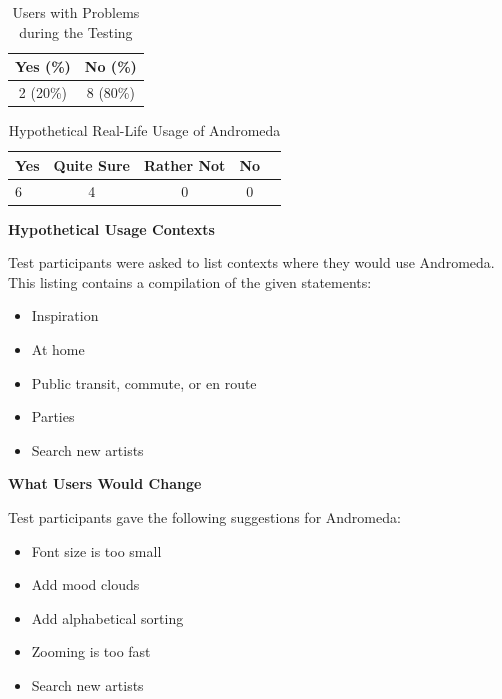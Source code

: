 \begin{table}[H]
\begin{center}
\begin{tabular}{ | c | c | }
	\hline
	\textbf{Yes (\%)} & \textbf{No (\%)} \\ \hline
	2 (20\%) & 8 (80\%) \\ \hline
\end{tabular}
\caption {Users with Problems during the Testing} \label{tab:problems-during-testing} 
\end{center}
\end{table}

\begin{table}[H]
\begin{center}
\begin{tabular}{ | l | c | c | c | c |}
	\hline
	\textbf{Yes} & \textbf{Quite Sure} & \textbf{Rather Not} & \textbf{No}\\ \hline
	6 & 4 & 0 & 0 \\ \hline
\end{tabular}
\caption {Hypothetical Real-Life Usage of Andromeda} \label{tab:hypothetical-prototype-usage} 
\end{center}
\end{table}

\textbf{Hypothetical Usage Contexts}

Test participants were asked to list contexts where they would use Andromeda. This listing contains a compilation of the given statements:

\begin{itemize}
	\item Inspiration
	\item At home
	\item Public transit, commute, or en route
	\item Parties
	\item Search new artists
\end{itemize}

\textbf{What Users Would Change}

Test participants gave the following suggestions for Andromeda:

\begin{itemize}
	\item Font size is too small
	\item Add mood clouds
	\item Add alphabetical sorting
	\item Zooming is too fast
	\item Search new artists
\end{itemize}

